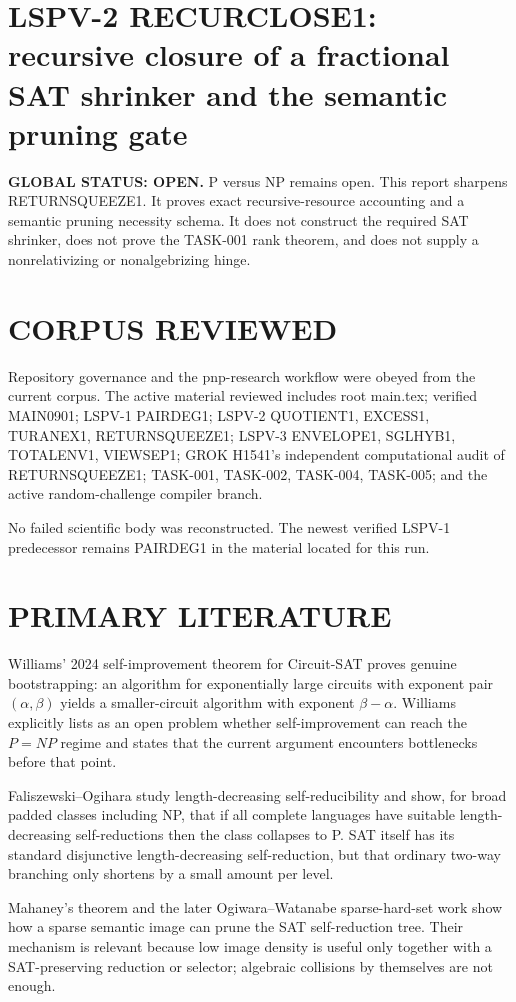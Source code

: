\documentclass[11pt]{article}
\begin{document}
\section*{LSPV-2 RECURCLOSE1: recursive closure of a fractional SAT shrinker and the semantic pruning gate}

\textbf{GLOBAL STATUS: OPEN.} P versus NP remains open. This report sharpens RETURNSQUEEZE1. It proves exact recursive-resource accounting and a semantic pruning necessity schema. It does not construct the required SAT shrinker, does not prove the TASK-001 rank theorem, and does not supply a nonrelativizing or nonalgebrizing hinge.

\section*{CORPUS REVIEWED}
Repository governance and the pnp-research workflow were obeyed from the current corpus. The active material reviewed includes root main.tex; verified MAIN0901; LSPV-1 PAIRDEG1; LSPV-2 QUOTIENT1, EXCESS1, TURANEX1, RETURNSQUEEZE1; LSPV-3 ENVELOPE1, SGLHYB1, TOTALENV1, VIEWSEP1; GROK H1541's independent computational audit of RETURNSQUEEZE1; TASK-001, TASK-002, TASK-004, TASK-005; and the active random-challenge compiler branch.

No failed scientific body was reconstructed. The newest verified LSPV-1 predecessor remains PAIRDEG1 in the material located for this run.

\section*{PRIMARY LITERATURE}
Williams' 2024 self-improvement theorem for Circuit-SAT proves genuine bootstrapping: an algorithm for exponentially large circuits with exponent pair \((\alpha,\beta)\) yields a smaller-circuit algorithm with exponent \(\beta-\alpha\). Williams explicitly lists as an open problem whether self-improvement can reach the \(P=NP\) regime and states that the current argument encounters bottlenecks before that point.

Faliszewski--Ogihara study length-decreasing self-reducibility and show, for broad padded classes including NP, that if all complete languages have suitable length-decreasing self-reductions then the class collapses to P. SAT itself has its standard disjunctive length-decreasing self-reduction, but that ordinary two-way branching only shortens by a small amount per level.

Mahaney's theorem and the later Ogiwara--Watanabe sparse-hard-set work show how a sparse semantic image can prune the SAT self-reduction tree. Their mechanism is relevant because low image density is useful only together with a SAT-preserving reduction or selector; algebraic collisions by themselves are not enough.
\end{document}
